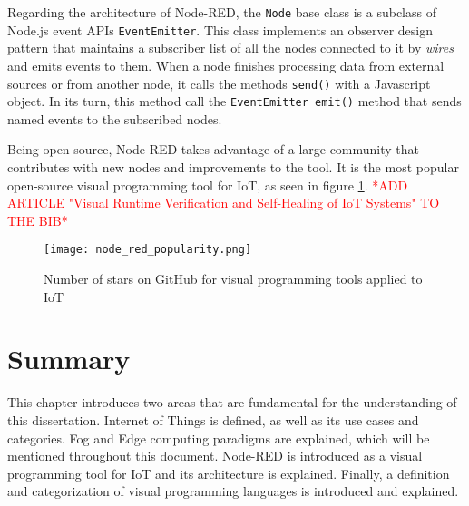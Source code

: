 \par Regarding the architecture of Node-RED, the \texttt{Node} base class is a subclass of Node.js event APIs \texttt{EventEmitter}. This class implements an observer design pattern that maintains a subscriber list of all the nodes connected to it by \emph{wires} and emits events to them. When a node finishes processing data from external sources or from another node, it calls the methods \texttt{send()} with a Javascript object. In its turn, this method call the \texttt{EventEmitter emit()} method that sends named events to the subscribed nodes. 
\par Being open-source, Node-RED takes advantage of a large community that contributes with new nodes and improvements to the tool. It is the most popular open-source visual programming tool for IoT, as seen in figure \ref{fig:node_red_popularity}. \textcolor{red}{*ADD ARTICLE "Visual Runtime Verification and Self-Healing of IoT Systems" TO THE BIB*}

\begin{figure}[h]
\caption{Number of stars on GitHub for visual programming tools applied to IoT}
\label{fig:node_red_popularity}
\centering
\texttt{[image: node\_red\_popularity.png]}
\end{figure}


\section{Summary}

This chapter introduces two areas that are fundamental for the understanding of this dissertation. Internet of Things is defined, as well as its use cases and categories. Fog and Edge computing paradigms are explained, which will be mentioned throughout this document. Node-RED is introduced as a visual programming tool for IoT and its architecture is explained. Finally, a definition and categorization of visual programming languages is introduced and explained.
